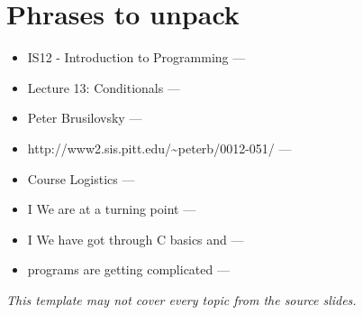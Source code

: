 \documentclass[12pt]{article}
\begin{document}
\section*{Phrases to unpack}
\begin{itemize}[leftmargin=*]
  \item IS12 - Introduction to Programming --- \hrulefill
  \vspace{1.1em}
  \item Lecture 13: Conditionals --- \hrulefill
  \vspace{1.1em}
  \item Peter Brusilovsky --- \hrulefill
  \vspace{1.1em}
  \item http://www2.sis.pitt.edu/\textasciitilde{}peterb/0012-051/ --- \hrulefill
  \vspace{1.1em}
  \item Course Logistics --- \hrulefill
  \vspace{1.1em}
  \item I We are at a turning point --- \hrulefill
  \vspace{1.1em}
  \item I We have got through C basics and --- \hrulefill
  \vspace{1.1em}
  \item programs are getting complicated --- \hrulefill
  \vspace{1.1em}
\end{itemize}
\vspace{2em}
\begin{center}
\textit{This template may not cover every topic from the source slides.}
\end{center}
\end{document}

